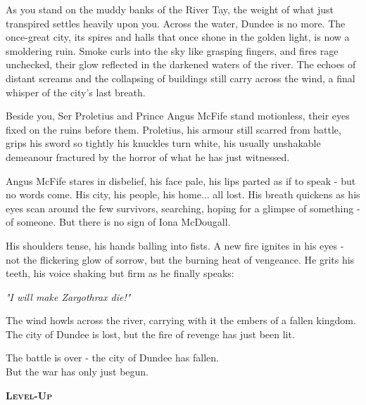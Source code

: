 \begin{DndReadAloud}
	As you stand on the muddy banks of the River Tay, the weight of what just transpired settles heavily upon you. Across the water, Dundee is no more. The once-great city, its spires and halls that once shone in the golden light, is now a smoldering ruin. Smoke curls into the sky like grasping fingers, and fires rage unchecked, their glow reflected in the darkened waters of the river. The echoes of distant screams and the collapsing of buildings still carry across the wind, a final whisper of the city's last breath.

	Beside you, Ser Proletius and Prince Angus McFife stand motionless, their eyes fixed on the ruins before them. Proletius, his armour still scarred from battle, grips his sword so tightly his knuckles turn white, his usually unshakable demeanour fractured by the horror of what he has just witnessed.

	Angus McFife stares in disbelief, his face pale, his lips parted as if to speak - but no words come. His city, his people, his home... all lost. His breath quickens as his eyes scan around the few survivors, searching, hoping for a glimpse of something - of someone. But there is no sign of Iona McDougall.

	His shoulders tense, his hands balling into fists. A new fire ignites in his eyes - not the flickering glow of sorrow, but the burning heat of vengeance. He grits his teeth, his voice shaking but firm as he finally speaks:

	\textit{"I will make Zargothrax die!"}

	The wind howls across the river, carrying with it the embers of a fallen kingdom. The city of Dundee is lost, but the fire of revenge has just been lit.
\end{DndReadAloud}

{\centering\entryfont The battle is over - the city of Dundee has fallen.\\But the war has only just begun.\\}

%

{\centering \Large\textcolor{titlegold}{\textbf{\textsc{Level-Up}}}\\}